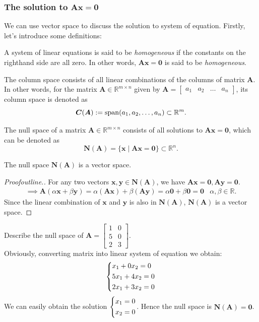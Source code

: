 \subsubsection{The solution to $\bm{Ax}= \bm 0$}
We can use vector space to discuss the solution to system of equation. Firstly, let's introduce some definitions:
\begin{definition}
A system of linear equations is said to be \emph{homogeneous} if the constants on the righthand
side are all zero. In other words, $\bm{Ax} = \bm 0$ is said to be \emph{homogeneous}.
\end{definition}
\begin{definition}
The column space consists of all linear combinations of the columns of matrix $\bm A$. In other words, for the matrix $\bm A\in\mathbb{R}^{m\times n}$ given by $\bm A = \left[
\begin{array}{c|c|c|c}
a_1&a_2&\ldots&a_n
\end{array}\right]$, its column space is denoted as 
\[
\bm C(\bm A) := \operatorname{span}(a_1,a_2,\dots,a_n)\subset\mathbb{R}^{m}.
\]
\end{definition}
\begin{definition}
The null space of a matrix $\bm A\in\mathbb{R}^{m\times n}$ consists of all solutions to $\bm{Ax} = \bm 0$, which can be denoted as 
\[
\bm N(\bm A) = \{\bm x\mid\bm{Ax} = \bm 0\}\subset\mathbb{R}^{n}.
\]
\end{definition}
\begin{proposition}
The null space $\bm N(\bm A)$ is a vector space.
\end{proposition}
\begin{proof}[Proofoutline.]
For any two vectors $\bm x,\bm y\in\bm N(\bm A)$, we have $\bm{Ax} = \bm 0,\bm{Ay} = \bm 0$.
\[
\begin{array}{ll}
\implies \bm A(\alpha\bm x +\beta\bm y) = \alpha(\bm{Ax})+\beta(\bm{Ay}) = \alpha\bm 0+\beta\bm 0 = \bm 0
&
\alpha,\beta\in\mathbb{R}.
\end{array}
\]
Since the linear combination of $\bm x$ and $\bm y$ is also in $\bm N(\bm A)$, $\bm N(\bm A)$ is a vector space.
\end{proof}
\begin{example}
Describe the null space of $\bm A = \begin{bmatrix}
1&0\\5&0\\2&3
\end{bmatrix}.$\\
Obviously, converting matrix into linear system of equation we obtain:
\[
\left\{\begin{lgathered}
x_1+0x_2=0\\5x_1+4x_2=0\\2x_1+3x_2=0
\end{lgathered}\right.
\]
We can easily obtain the solution 
$\left\{\begin{lgathered}
x_1=0\\x_2=0
\end{lgathered}\right.$. 
Hence the null space is $\bm N(\bm A) = \bm 0$.
\end{example}
